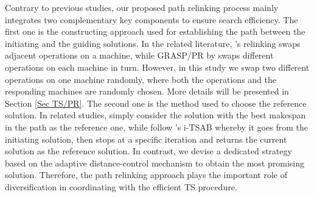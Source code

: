 \documentclass[authoryear,12pt]{elsarticle}
\begin{document}
Contrary to previous studies, our proposed path relinking process mainly integrates two complementary key components to ensure search efficiency. The first one is the constructing approach used for establishing the path between the initiating and the guiding solutions. In the related literature, \cite{Nasiri2012guidedTSPR}'s relinking swaps adjacent operations on a machine, while GRASP/PR by \cite{Aiex2003GRASPwithPR} swaps different operations on each machine in turn. However, in this study we swap two different operations on one machine randomly, where both the operations and the responding machines are randomly chosen. More details will be presented in Section \ref{Sec TS/PR}. The second one is the method used to choose the reference solution. In related studies, \cite{Aiex2003GRASPwithPR} simply consider the solution with the best makespan in the path as the reference one, while \cite{Nasiri2012guidedTSPR} follow \cite{Nowicki2005i-TSAB}'s i-TSAB whereby it goes from the initiating solution, then stops at a specific iteration and returns the current solution as the reference solution. In contrast, we devise a dedicated strategy based on the adaptive distance-control mechanism to obtain the most promising solution. Therefore, the path relinking approach plays the important role of diversification in coordinating with the efficient TS procedure. 
\end{document}

